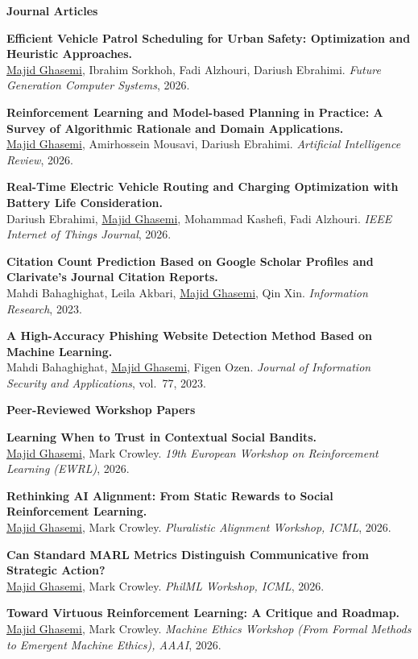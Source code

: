 \documentclass[letterpaper,11pt]{article}
\newcommand{\gap}{\vspace{0.7em}}
\newcommand{\me}{\underline{Majid Ghasemi}}
\begin{document}
\gap


\textbf{\small Journal Articles}
\begin{jlist}
  \item \textbf{Efficient Vehicle Patrol Scheduling for Urban Safety: Optimization and Heuristic Approaches.}\\
        \me, Ibrahim Sorkhoh, Fadi Alzhouri, Dariush Ebrahimi.
        \textit{Future Generation Computer Systems}, 2026.
          \item \textbf{Reinforcement Learning and Model-based Planning in Practice: A Survey of Algorithmic Rationale and Domain Applications.}\\
        \me, Amirhossein Mousavi, Dariush Ebrahimi.
        \textit{Artificial Intelligence Review}, 2026.
  \item \textbf{Real-Time Electric Vehicle Routing and Charging Optimization with Battery Life Consideration.}\\
        Dariush Ebrahimi, \me, Mohammad Kashefi, Fadi Alzhouri.
        \textit{IEEE Internet of Things Journal}, 2026.
  \item \textbf{Citation Count Prediction Based on Google Scholar Profiles and Clarivate's Journal Citation Reports.}\\
        Mahdi Bahaghighat, Leila Akbari, \me, Qin Xin.
        \textit{Information Research}, 2023.
  \item \textbf{A High-Accuracy Phishing Website Detection Method Based on Machine Learning.}\\
        Mahdi Bahaghighat, \me, Figen Ozen.
        \textit{Journal of Information Security and Applications}, vol.~77, 2023.
\end{jlist}
\gap


\textbf{\small Peer-Reviewed Workshop Papers}
\begin{wlist}
  \item \textbf{Learning When to Trust in Contextual Social Bandits.}\\
        \me, Mark Crowley.
        \textit{19th European Workshop on Reinforcement Learning (EWRL)}, 2026.
  \item \textbf{Rethinking AI Alignment: From Static Rewards to Social Reinforcement Learning.}\\
        \me, Mark Crowley.
        \textit{Pluralistic Alignment Workshop, ICML}, 2026.
  \item \textbf{Can Standard MARL Metrics Distinguish Communicative from Strategic Action?}\\
        \me, Mark Crowley.
        \textit{PhilML Workshop, ICML}, 2026.
  \item \textbf{Toward Virtuous Reinforcement Learning: A Critique and Roadmap.}\\
        \me, Mark Crowley.
        \textit{Machine Ethics Workshop (From Formal Methods to Emergent Machine Ethics), AAAI}, 2026.
\end{wlist}
\gap
\end{document}
